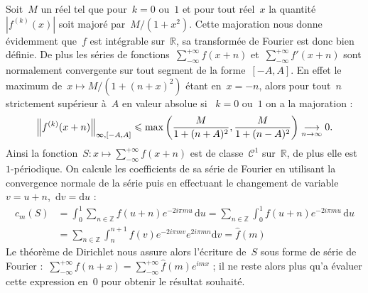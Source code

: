 		\begin{dem}
			Soit~$M$ un réel tel que pour~$k=0$ ou~$1$ et pour tout réel~$x$ la quantité~$|f^{(k)}(x)|$ soit majoré par~$M/(1+x^2)$. Cette majoration nous donne évidemment que~$f$ est intégrable sur~$\mathbb{R}$, sa transformée de Fourier est donc bien définie. De plus les séries de fonctions~$\sum_{-\infty}^{+\infty} f(x+n)$ et~$\sum_{-\infty}^{+\infty} f'(x+n)$ sont normalement convergente sur tout segment de la forme~$[-A,A]$. En effet le maximum de~$x\mapsto M/(1+(n+x)^2)$ étant en~$x=-n$, alors pour tout~$n$ strictement supérieur à~$A$ en valeur absolue si ~$k=0$ ou~$1$ on a la majoration :
			\[
				\left\Vert f^{(k)}(x+n)\right\Vert_{\infty,[-A,A]} \leqslant 
				\max\left( \frac{M}{1+(n+A)^2} , \frac{M}{1+(n-A)^2} \right)
				\underset{n\rightarrow\infty}{\longrightarrow} 0.
			\]
			Ainsi la fonction~$S : x\mapsto\sum_{-\infty}^{+\infty} f(x+n)$ est de classe~$\mathscr{C}^1$ sur~$\mathbb{R}$, de plus elle est~$1$-périodique. On calcule les coefficients de sa série de Fourier en utilisant la convergence normale de la série puis en effectuant le changement de variable~$v=u+n$,~$\mathrm{d}v = \mathrm{d}u$ :
			\begin{align*}
				c_m(S) 	& = \int_{0}^{1} \sum_{n\in\mathbb{Z}} f(u+n) e^{-2i\pi mu}\,\mathrm{d}u
						  = \sum_{n\in\mathbb{Z}}\int_{0}^{1} f(u+n) e^{-2i\pi mu}\,\mathrm{d}u\\
						& = \sum_{n\in\mathbb{Z}}\int_{n}^{n+1} f(v) e^{-2i\pi mv}e^{2i\pi mn}\mathrm{d}v
						  = \hat{f}(m)
			\end{align*}
			Le théorème de Dirichlet nous assure alors l'écriture de~$S$ sous forme de série de Fourier :~$\sum_{-\infty}^{+\infty} f(n+x) = \sum_{-\infty}^{+\infty} \hat{f}(m)e^{imx}$ ; il ne reste alors plus qu'a évaluer cette expression en~$0$ pour obtenir le résultat souhaité.
		\end{dem}
	\boldmath	
